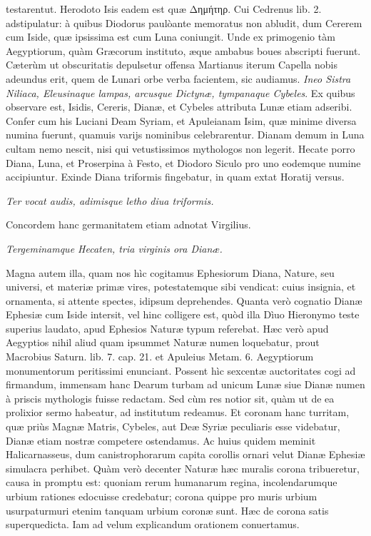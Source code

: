\documentclass[a4paper, 11pt, oneside, polutonikogreek, latin]{article}
\begin{document}
testarentut. Herodoto Isis eadem est quæ Δημήτηρ. Cui Cedrenus lib. 2. adstipulatur: à quibus Diodorus paulòante memoratus non abludit, dum Cererem cum Iside, quæ ipsissima est cum Luna coniungit. Unde ex primogenio tàm Aegyptiorum, quàm Græcorum instituto, æque ambabus boues abscripti fuerunt. Cæterùm ut obscuritatis depulsetur offensa Martianus iterum Capella nobis adeundus erit, quem de Lunari orbe verba facientem, sic audiamus. \emph{Ineo Sistra Niliaca, Eleusinaque lampas, arcusque Dictynæ, tympanaque Cybeles}. Ex quibus observare est, Isidis, Cereris, Dianæ, et Cybeles attributa Lunæ etiam adseribi. Confer cum his Luciani Deam Syriam, et Apuleianam Isim, quæ minime diversa numina fuerunt, quamuis varijs nominibus celebrarentur. Dianam demum in Luna cultam nemo nescit, nisi qui vetustissimos mythologos non legerit. Hecate porro Diana, Luna, et Proserpina à Festo, et Diodoro Siculo pro uno eodemque numine accipiuntur. Exinde Diana triformis fingebatur, in quam extat Horatij versus.

\emph{Ter vocat audis, adimisque letho diua triformis.}

Concordem hanc germanitatem etiam adnotat Virgilius.

\emph{Tergeminamque Hecaten, tria virginis ora Dianæ.}

Magna autem illa, quam nos hìc cogitamus Ephesiorum Diana, Nature, seu universi, et materiæ primæ vires, potestatemque sibi vendicat: cuius insignia, et ornamenta, si attente spectes, idipsum deprehendes. Quanta verò cognatio Dianæ Ephesiæ cum Iside intersit, vel hinc colligere est, quòd illa Dìuo Hieronymo teste superius laudato, apud Ephesios Naturæ typum referebat. Hæc verò apud Aegyptios nihil aliud quam ipsummet Naturæ numen loquebatur, prout Macrobius Saturn. lib. 7. cap. 21. et Apuleius Metam. 6. Aegyptiorum monumentorum peritissimi enunciant. Possent hìc sexcentæ auctoritates cogi ad firmandum, immensam hanc Dearum turbam ad unicum Lunæ siue Dianæ numen à priscis mythologis fuisse redactam. Sed cùm res notior sit, quàm ut de ea prolixior sermo habeatur, ad institutum redeamus. Et coronam hanc turritam, quæ priùs Magnæ Matris, Cybeles, aut Deæ Syriæ peculiaris esse videbatur, Dianæ etiam nostræ competere ostendamus. Ac huius quidem meminit Halicarnasseus, dum canistrophorarum capita corollis ornari velut Dianæ Ephesiæ simulacra perhibet. Quàm verò decenter Naturæ hæc muralis corona tribueretur, causa in promptu est: quoniam rerum humanarum regina, incolendarumque urbium rationes edocuisse credebatur; corona quippe pro muris urbium usurpaturmuri etenim tanquam urbium coronæ sunt. Hæc de corona satis superquedicta. Iam ad velum explicandum orationem conuertamus.
\clearpage
\end{document}
